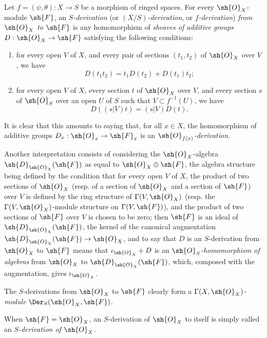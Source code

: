 \begin{env}[16.5.1]
\label{IV.16.5.1}
Let $f = (\psi, \theta) : X \to S$ be a morphism of ringed spaces.
For every $\sh{O}_X$-module $\sh{F}$, an \emph{$S$-derivation} (or \emph{$(X/S)$-derivation}, or \emph{$f$-derivation}) \emph{from $\sh{O}_X$ to $\sh{F}$} is any homomorphism of \emph{sheaves of additive groups} $D : \sh{O}_X \to \sh{F}$ satisfying the following conditions:
\begin{enumerate}
  \item[(a)] for every open $V$ of $X$, and every pair of sections $(t_1, t_2)$ of $\sh{O}_X$ over $V$, we have
  \[
  \label{IV.16.5.1.1}
    D(t_1 t_2) = t_1 D(t_2) + D(t_1)t_2;
    \tag{16.5.1.1}
  \]
  \item[(b)] for every open $V$ of $X$, every section $t$ of $\sh{O}_X$ over $V$, and every section $s$ of $\sh{O}_S$ over an open $U$ of $S$ such that $V \subset f^{-1}(U)$, we have
  \[
  \label{IV.16.5.1.2}
    D((s|V)t) = (s|V)D(t).
    \tag{16.5.1.2}
  \]
\end{enumerate}
It is clear that this amounts to saying that, for all $x \in X$, the homomorphism of additive groups $D_x : \sh{O}_x \to \sh{F}_x$ is an \emph{$\sh{O}_{f(x)}$-derivation}.

Another interpretation consists of considering the $\sh{O}_X$-algebra $\sh{D}_{\sh{O}_X}(\sh{F})$ as equal to $\sh{O}_X \oplus \sh{F}$, the algebra structure being defined by the condition that for every open $V$ of $X$, the product of two sections of $\sh{O}_X$ (resp. of a section of $\sh{O}_X$ and a section of $\sh{F}$) over $V$ is defined by the ring structure of $\Gamma(V, \sh{O}_X)$ (resp. the $\Gamma(V, \sh{O}_X)$-module structure on $\Gamma(V, \sh{F})$), and the product of two sections of $\sh{F}$ over $V$ is chosen to be zero;
then $\sh{F}$ is an ideal of $\sh{D}_{\sh{O}_X}(\sh{F})$, the kernel of the canonical augmentation $\sh{D}_{\sh{O}_X}(\sh{F}) \to \sh{O}_X$, and to say that $D$ is an $S$-derivation from $\sh{O}_X$ to $\sh{F}$ means that $\iota_{\sh{O}_X} + D$ is an \emph{$\sh{O}_S$-homomorphism of algebras} from $\sh{O}_X$ to $\sh{D}_{\sh{O}_X}(\sh{F})$, which, composed with the augmentation, gives $\iota_{\sh{O}_X}$.

The $S$-derivations from $\sh{O}_X$ to $\sh{F}$ clearly form a \emph{$\Gamma(X, \sh{O}_X)$-module} $\Der_S(\sh{O}_X, \sh{F})$.

When $\sh{F} = \sh{O}_X$, an $S$-derivation of $\sh{O}_X$ to itself is simply called an \emph{$S$-derivation of $\sh{O}_X$}.
\end{env}

